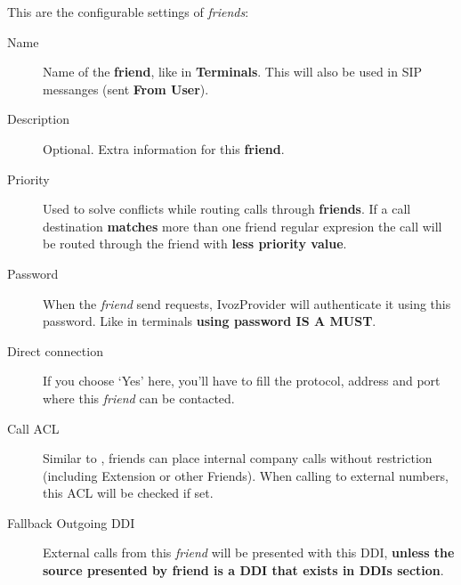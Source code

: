 \documentclass[letterpaper,10pt,english]{sphinxmanual}
\begin{document}
This are the configurable settings of \emph{friends}:
\begin{description}
\item[{Name}] \leavevmode{}\label{pbx_features/friends:term-name}
Name of the \textbf{friend}, like in \textbf{Terminals}. This will also be used
in SIP messanges (sent \textbf{From User}).

\item[{Description}] \leavevmode{}\label{pbx_features/friends:term-description}
Optional. Extra information for this \textbf{friend}.

\item[{Priority}] \leavevmode{}\label{pbx_features/friends:term-priority}
Used to solve conflicts while routing calls through \textbf{friends}.
If a call destination \textbf{matches} more than one friend regular expresion
the call will be routed through the friend with \textbf{less priority value}.

\item[{Password}] \leavevmode{}\label{pbx_features/friends:term-password}
When the \emph{friend} send requests, IvozProvider will authenticate it using
this password. Like in terminals \textbf{using password IS A MUST}.

\item[{Direct connection}] \leavevmode{}\label{pbx_features/friends:term-direct-connection}
If you choose `Yes' here, you'll have to fill the protocol, address and
port where this \emph{friend} can be contacted.

\item[{Call ACL}] \leavevmode{}\label{pbx_features/friends:term-call-acl}
Similar to {\hyperref[pbx_features/users:users]{}}, friends can place internal
company calls without restriction (including Extension or other Friends).
When calling to external numbers, this ACL will be checked if set.

\item[{Fallback Outgoing DDI}] \leavevmode{}\label{pbx_features/friends:term-fallback-outgoing-ddi}
External calls from this \emph{friend} will be presented with this DDI, \textbf{unless
the source presented by friend is a DDI that exists in DDIs section}.


\end{description}
\end{document}

